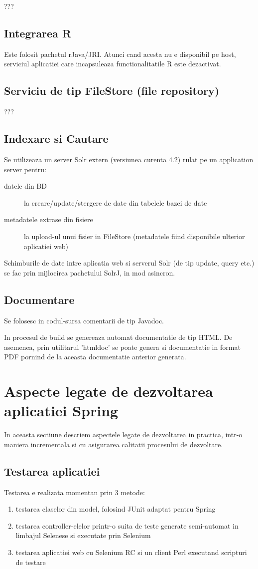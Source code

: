 ???

\subsection{Integrarea R}
Este folosit pachetul rJava/JRI. Atunci cand acesta nu e disponibil pe host,
serviciul aplicatiei care incapsuleaza functionalitatile R este dezactivat.

\subsection{Serviciu de tip FileStore (file repository)}
???

\subsection{Indexare si Cautare}
Se utilizeaza un server Solr extern (versiunea curenta 4.2) rulat pe un
application server pentru:
\begin{description}
\item[datele din BD] la creare/update/stergere de date din tabelele bazei de
date
\item[metadatele extrase din fisiere] la upload-ul unui fisier
in FileStore (metadatele fiind disponibile ulterior aplicatiei web)
\end{description}

Schimburile de date intre aplicatia web si serverul Solr (de tip update, query
etc.) se fac prin mijlocirea pachetului SolrJ, in mod asincron.

\subsection{Documentare}
Se folosesc in codul-sursa comentarii de tip Javadoc. 

In procesul de build se genereaza automat documentatie  de tip HTML. 
De asemenea, prin utilitarul 'htmldoc' se poate genera
si documentatie in format PDF pornind de la aceasta documentatie anterior
generata.

\section{Aspecte legate de dezvoltarea aplicatiei Spring}
In aceasta sectiune descriem aspectele legate de dezvoltarea in practica, intr-o
maniera incrementala si cu asigurarea calitatii procesului de dezvoltare.

\subsection{Testarea aplicatiei}
Testarea e realizata momentan prin 3 metode:
\begin{enumerate}
  \item testarea claselor din model, folosind JUnit adaptat pentru Spring
  \item testarea controller-elelor printr-o suita de teste generate semi-automat
  in limbajul Selenese si executate prin Selenium
  \item testarea aplicatiei web cu Selenium RC si un client Perl executand
  scripturi de testare
\end{enumerate}

